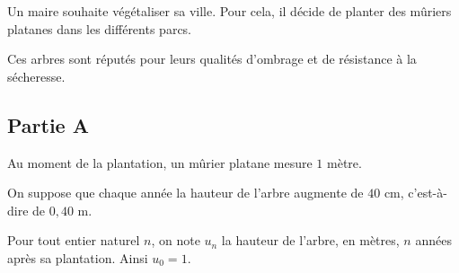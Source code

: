 Un maire souhaite végétaliser sa ville. Pour cela, il décide de planter des mûriers platanes dans les différents parcs.
			
			Ces arbres sont réputés pour leurs qualités d'ombrage et de résistance à la sécheresse.
			
			\subsection*{Partie A}
			
			Au moment de la plantation, un mûrier platane mesure $1$ mètre.
			
			On suppose que chaque année la hauteur de l'arbre augmente de $40$ cm, c'est-à-dire de $0{,}40$ m.
			
			Pour tout entier naturel $n$, on note $u_n$ la hauteur de l'arbre, en mètres, $n$ années après sa plantation. Ainsi $u_0=1$.
			
